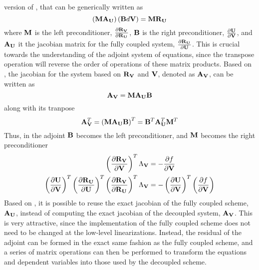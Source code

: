 \documentclass[a4paper]{report}
\begin{document}
version of , that can be generically written as
\begin{equation}
  \left(\mathbf M \mathbf A_{\mathbf U} \right) \left( \mathbf B d\mathbf V \right) = \mathbf M \mathbf R_{{\mathbf U}_{}}
  \label{generic-dc}
\end{equation}
where $\mathbf M$ is the left preconditioner, $\frac{\partial \mathbf R_{{\mathbf V}_{}}}{\partial \mathbf R_{{\mathbf U}_{}}}$, $\mathbf B$ is the right
preconditioner, $\frac{\partial \mathbf U}{\partial \mathbf V}$, and $\mathbf A_{\mathbf U}$ it the jacobian matrix for the
fully coupled system, $\frac{\partial \mathbf R_{{\mathbf U}_{}}}{\partial \mathbf U}$.  This is crucial towards the
understanding of the adjoint system of equations, since the transpose operation
will reverse the order of operations of these matrix products.  Based on
, the jacobian for the system based on $\mathbf R_{{\mathbf V}_{}}$ and $\mathbf V$,
denoted as $\mathbf A_{\mathbf V}$, can be written as
\begin{equation}
  \mathbf A_{\mathbf V} = \mathbf M \mathbf A_{\mathbf U} \mathbf B
  \label{adj-dc-generic}
\end{equation}
along with its tranpose
\begin{equation}
  \mathbf A_{\mathbf V}^{T}
   = \left( \mathbf M \mathbf A_{\mathbf U} \mathbf B \right)^{T}
   = \mathbf B^{T} \mathbf A_{\mathbf U}^{T} \mathbf M^{T}
  \label{adj-dc-generic-transpose}
\end{equation}
Thus, in the adjoint $\mathbf B$ becomes the left preconditioner, and $\mathbf M$ becomes
the right preconditioner
\begin{equation}
  \begin{aligned}
    \left(\frac{\partial \mathbf R_{{\mathbf V}_{}}}{\partial \mathbf V} \right)^{T} \Lambda_{\mathbf V} &= -\frac{\partial f}{\partial \mathbf V} \\
    \left( \frac{\partial \mathbf U}{\partial \mathbf V} \right)^{T}
    \left(\frac{\partial \mathbf R_{{\mathbf U}_{}}}{\partial \mathbf U} \right)^{T} 
    \left( \frac{\partial \mathbf R_{{\mathbf V}_{}}}{\partial \mathbf R_{{\mathbf U}_{}}} \right)^{T}
    \Lambda_{\mathbf V} 
    &= 
    - \left( \frac{\partial \mathbf U}{\partial \mathbf V} \right)^{T}
    \left( \frac{\partial f}{\partial \mathbf V} \right)
  \end{aligned}
  \label{adj-u-to-v}
\end{equation}
Based on , it is possible to reuse the exact jacobian of the
fully coupled scheme, $\mathbf A_{\mathbf U}$, instead of computing the exact jacobian of
the decoupled system, $\mathbf A_{\mathbf V}$.  This is very attractive, since the
implementation of the fully coupled scheme does not need to be changed at the
low-level linearizations.  Instead, the residual of the adjoint can be formed in
the exact same fashion as the fully coupled scheme, and a series of matrix
operations can then be performed to transform the equations and dependent
variables into those used by the decoupled scheme.
\end{document}
